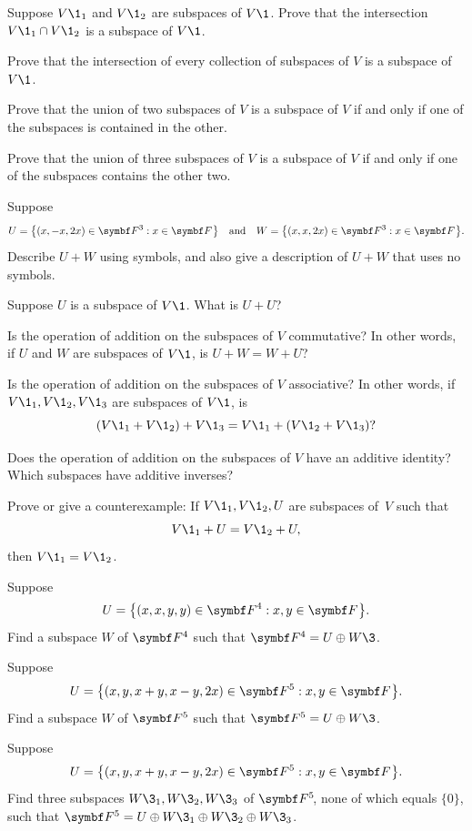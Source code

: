\begin{exercises}
\exercise
Suppose $V\1_1$ and $V\1_2$ are subspaces of $V\1$. Prove that the intersection $V\1_1 \cap V\1_2$ is a subspace of $V\1$.


\exercise
Prove that the intersection of every collection of subspaces of $V$ is a subspace of $V\1$.


\exercise
Prove that the union of two subspaces of $V$ is a subspace of $V$ if and only if
one of the subspaces is contained in the other. \label{218}


\exercise
Prove that the union of three subspaces of $V$ is a subspace of $V$ if and only if one of the subspaces contains the other two.\label{1threesub}


\exercise
Suppose
\[
U = \br[\big]{ (x, -x, 2x) \in \F3 : x\in \F{}} \andd W = \br[\big]{ (x, x, 2x) \in \F3: x \in \F{}}.
\]
Describe $U+W$ using symbols, and also give a description of $U + W$ that uses no symbols.


\exercise
Suppose $U$ is a subspace of $V\1$.  What is $U + U$?


\exercise
Is the operation of addition on the subspaces of $V$ commutative?
In other words, if $U$ and $W$ are subspaces of $V\1$, is
$U + W = W + U$?


\exercise
Is the operation of addition on the subspaces of $V$ associative?
In other words, if $V\1_1,V\1_2, V\1_3$ are subspaces of $V\1$, is
\[
(V\1_1 + V\1_2) + V\1_3 = V\1_1 + (V\1_2 + V\1_3)?
\]
\exercisedisplayend


\exercise
Does the operation of addition on the subspaces of $V$ have an
additive identity?  Which subspaces have additive inverses?


\exercise
Prove or give a counterexample: If $V\1_1, V\1_2, U$ are subspaces of~$V$ such
that
\[
V\1_1 + U = V\1_2 + U,
\]
then $V\1_1 = V\1_2$.


\exercise
Suppose
\[
U = \br[\big]{(x, x, y, y) \in \F{4}: x, y \in \F{}}.
\]
Find a subspace $W$ of $\F{4}$ such that
$\F{4} = U \oplus W\3$.


\exercise
Suppose
\[
U = \br[\big]{(x, y, x+y, x-y, 2x) \in \F{5}: x, y \in \F{}}.
\]
Find a subspace $W$ of $\F{5}$ such that
$\F{5} = U \oplus W\3$.


\exercise
Suppose
\[
U = \br[\big]{(x, y, x+y, x-y, 2x) \in \F{5}: x, y \in \F{}}.
\]
Find three subspaces $W\3_1, W\3_2, W\3_3$ of $\FF{5}$, none of which equals $\{0\}$, such that
$\F{5} = U \oplus W\3_1 \oplus W\3_2 \oplus W\3_3$.



\end{exercises}
